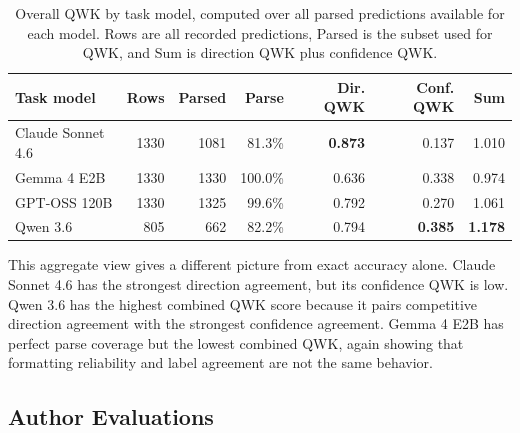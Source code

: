 \documentclass[sigconf,screen]{acmart}
\renewcommand{\arraystretch}{1.05}
\begin{document}
\begin{table}[t]
    \centering
    \small
    \setlength{\tabcolsep}{3pt}
    \renewcommand{\arraystretch}{1.1}
    \begin{tabular}{lrrrrrr}
        \hline
        \textbf{Task model} & \textbf{Rows} & \textbf{Parsed} &
        \textbf{Parse} & \textbf{Dir. QWK} &
        \textbf{Conf. QWK} & \textbf{Sum} \\
        \hline
        Claude Sonnet 4.6 & 1330 & 1081 & 81.3\% & \textbf{0.873} & 0.137 & 1.010 \\
        Gemma 4 E2B & 1330 & 1330 & 100.0\% & 0.636 & 0.338 & 0.974 \\
        GPT-OSS 120B & 1330 & 1325 & 99.6\% & 0.792 & 0.270 & 1.061 \\
        Qwen 3.6 & 805 & 662 & 82.2\% & 0.794 & \textbf{0.385} & \textbf{1.178} \\
        \hline
    \end{tabular}
    \caption{Overall QWK by task model, computed over all parsed predictions
    available for each model. Rows are all recorded predictions, Parsed is the
    subset used for QWK, and Sum is direction QWK plus confidence QWK.}
    \label{tab:qwk_per_model}
\end{table}

This aggregate view gives a different picture from exact accuracy alone. Claude
Sonnet 4.6 has the strongest direction agreement, but its confidence QWK is
low. Qwen 3.6 has the highest combined QWK score because it pairs competitive
direction agreement with the strongest confidence agreement. Gemma 4 E2B has
perfect parse coverage but the lowest combined QWK, again showing that
formatting reliability and label agreement are not the same behavior.

\subsection{Author Evaluations}
\end{document}
